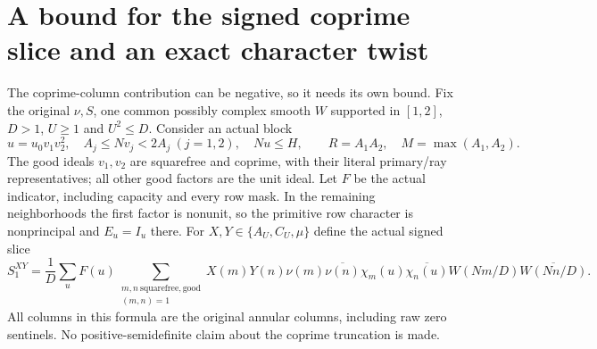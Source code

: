 \section{A bound for the signed coprime slice and an exact character twist}\label{sw:core}
The coprime-column contribution can be negative, so it needs its own bound.
Fix the original $\nu,S$, one common possibly complex smooth $W$ supported
in $[1,2]$, $D>1$, $U\ge1$ and $U^2\le D$. Consider an actual block
\[
 u=u_0v_1v_2^2,\quad A_j\le Nv_j<2A_j\ (j=1,2),\quad Nu\le H,
 \qquad R=A_1A_2,\quad M=\max(A_1,A_2).
\]
The good ideals $v_1,v_2$ are squarefree and coprime, with their literal
primary/ray representatives; all other good factors are the unit ideal.
Let $F$ be the actual indicator, including capacity and every row mask.
In the remaining neighborhoods the first factor is nonunit, so the
primitive row character is nonprincipal and $E_u=I_u$ there.
For $X,Y\in\{A_U,C_U,\mu\}$ define the actual signed slice
\begin{equation}\label{sw:slice}
 S_1^{XY}=\frac1D\sum_uF(u)
 \sum_{\substack{m,n\ \mathrm{squarefree,good}\\(m,n)=1}}
 X(m)Y(n)\nu(m)\overline{\nu(n)}\chi_m(u)\overline{\chi_n(u)}
 W(Nm/D)\overline{W(Nn/D)}.
\end{equation}
All columns in this formula are the original annular columns, including
raw zero sentinels. No positive-semidefinite claim about the coprime
truncation is made.

